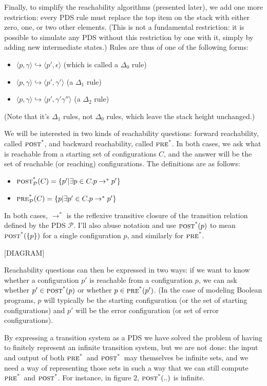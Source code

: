 \documentclass{article}
\newcommand{\Config}[2]{\ensuremath{\langle #1, #2 \rangle}}
\newcommand{\Rule}[2]{\ensuremath{#1 \hookrightarrow #2}}
\newcommand{\poststar}{\ensuremath{\textsc{post}^\textsc{*}}}
\newcommand{\prestar}{\ensuremath{\textsc{pre}^\textsc{*}}}
\begin{document}
Finally, to simplify the reachability algorithms (presented later), we
add one more restriction: every PDS rule must replace the top item on
the stack with either zero, one, or two other elements. (This is not a
fundamental restriction: it is possible to simulate any PDS without
this restriction by one with it, simply by adding new intermediate
states.) Rules are thus of one of the following forms:
\begin{itemize}
\item \Rule{\Config{p}{\gamma}}{\Config{p'}{\epsilon}} (which is called a
$\Delta_0$ rule)
\item \Rule{\Config{p}{\gamma}}{\Config{p'}{\gamma'}} (a $\Delta_1$
  rule)
\item \Rule{\Config{p}{\gamma}}{\Config{p'}{\gamma'\gamma''}} (a
  $\Delta_2$ rule)
\end{itemize}

(Note that it's $\Delta_1$ rules, not $\Delta_0$ rules, which leave
the stack height unchanged.)

We will be interested in two kinds of reachability questions: forward
reachability, called \poststar, and backward reachability, called
\prestar. In both cases, we ask what is reachable from a starting set
of configurations $C$, and the answer will be the set of reachable (or
reaching) configurations. The definitions are as follows:
\begin{itemize}
\item $\poststar_{\mathcal{P}}(C) = \{p' | \exists p\in C. p \rightarrow^*
  p'\}$
\item $\prestar_{\mathcal{P}}(C) = \{p | \exists p'\in C. p \rightarrow^*
  p'\}$
\end{itemize}
In both cases, $\rightarrow^*$ is the reflexive transitive closure of
the transition relation defined by the PDS $\mathcal{P}$. I'll also
abuse notation and use $\poststar(p)$ to mean $\poststar(\{p\})$ for a
single configuration $p$, and similarly for \prestar.

[DIAGRAM]

Reachability questions can then be expressed in two ways: if we want
to know whether a configuration $p'$ is reachable from a configuration
$p$, we can ask whether $p' \in \poststar(p)$ or whether $p \in
\prestar(p')$. (In the case of modeling Boolean programs, $p$ will
typically be the starting configuration (or the set of starting
configurations) and $p'$ will be the error configuration (or set of
error configurations).

By expressing a transition system as a PDS we have solved the problem
of having to finitely represent an infinite transition system, but we
are not done: the input and output of both \prestar\ and
\poststar\ may themselves be infinite sets, and we need a way of
representing those sets in such a way that we can still compute
\prestar\ and \poststar. For instance, in figure 2, $\poststar(..)$ is
infinite.
\end{document}
